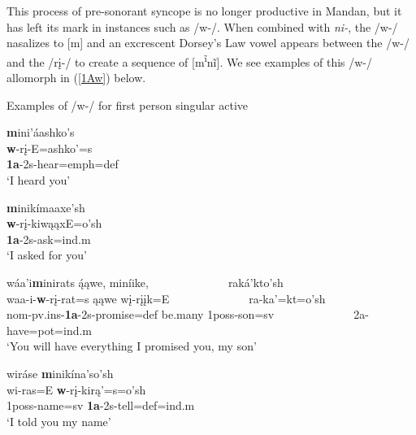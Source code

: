 This process of pre-sonorant syncope is no longer productive in Mandan, but it has left its mark in instances such as /w-/. When combined with \textit{ni-}, the /w-/ nasalizes to [m] and an excrescent Dorsey's Law vowel appears between the /w-/ and the /rį-/ to create a sequence of [m\textsuperscript{ĩ}nĩ]. We see examples of this /w-/ allomorph in (\ref{1Aw}) below.



\begin{exe}
\item\label{1Aw} Examples of /w-/ for first person singular active

	\begin{xlist}
	
	\item \glll \textbf{m}ini'áashko's \\
	\textbf{w}-rį-E=ashko'=s\\
	\textbf{1a}-2s-\textnormal{hear}=emph=def\\
	\glt `I heard you' \citep[41]{hollow1973a}
	
	
	\item \glll \textbf{m}inikímaaxe'sh\\
	\textbf{w}-rį-kiwąąxE=o'sh\\
	\textbf{1a}-2s-\textnormal{ask}=ind.m\\
	\glt `I asked for you' \citep[131]{hollow1973a}
	
	\item \glll wáa'i\textbf{m}inirats ą́ąwe, miníike, ~ ~ ~ ~ ~ ~ ~ ~ raká'kto'sh\\
	waa-i-\textbf{w}-rį-rat=s ąąwe wį-rįįk=E ~ ~ ~ ~ ~ ~ ~ ~ ra-ka'=kt=o'sh\\
	nom-pv.ins-\textbf{1a}-2s-\textnormal{promise}=def \textnormal{be.many} 1poss-\textnormal{son}=sv ~ ~ ~ ~ ~ ~ ~ ~ 2a-\textnormal{have}=pot=ind.m\\
	\glt `You will have everything I promised you, my son' \citep[192]{hollow1973a}
	
	\item \glll wiráse \textbf{m}inikína'so'sh\\
	wi-ras=E \textbf{w}-rį-kirą'=s=o'sh\\
	1poss-\textnormal{name}=sv \textbf{1a}-2s-\textnormal{tell}=def=ind.m\\
	\glt `I told you my name' \citep[58]{hollow1973a}
	

\end{xlist}
\end{exe}
